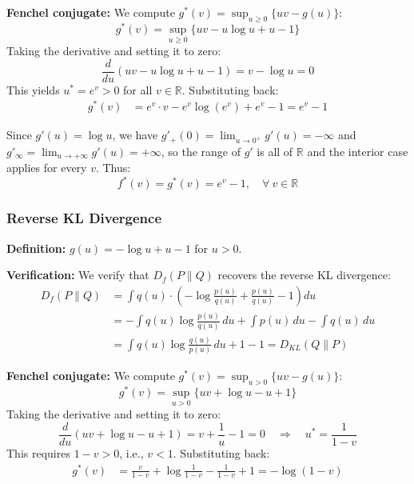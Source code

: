 \textbf{Fenchel conjugate:} We compute $g^*(v) = \sup_{u \geq 0} \{ uv - g(u) \}$:
\begin{equation*}
g^*(v) = \sup_{u \geq 0} \{ uv - u \log u + u - 1 \}
\end{equation*}
Taking the derivative and setting it to zero:
\begin{equation*}
\frac{d}{du}(uv - u \log u + u - 1) = v - \log u = 0
\end{equation*}
This yields $u^* = e^v > 0$ for all $v \in \mathbb{R}$. Substituting back:
\begin{align*}
g^*(v) &= e^v \cdot v - e^v \log(e^v) + e^v - 1  = e^v - 1
\end{align*}

Since $g'(u) = \log u$, we have $g'_+(0) = \lim_{u \to 0^+} g'(u) = -\infty$ and $g'_\infty = \lim_{u \to +\infty} g'(u) = +\infty$, so the range of $g'$ is all of $\mathbb{R}$ and the interior case applies for every $v$. Thus:
\begin{equation*}
f^*(v) = g^*(v) = e^v - 1, \quad \forall \ v \in \mathbb{R}
\end{equation*}

\subsubsection{Reverse KL Divergence}

\textbf{Definition:} $g(u) = -\log u + u - 1$ for $u > 0$.

\textbf{Verification:} We verify that $D_f(P \| Q)$ recovers the reverse KL divergence:
\begin{align*}
D_f(P \| Q) &= \int q(u) \cdot \left( -\log \frac{p(u)}{q(u)} + \frac{p(u)}{q(u)} - 1 \right) du \nonumber \\
&= -\int q(u) \log \frac{p(u)}{q(u)} \, du + \int p(u) \, du - \int q(u) \, du \nonumber \\
&= \int q(u) \log \frac{q(u)}{p(u)} \, du + 1 - 1 = D_{KL}(Q \| P)
\end{align*}

\textbf{Fenchel conjugate:} We compute $g^*(v) = \sup_{u > 0} \{ uv - g(u) \}$:
\begin{equation*}
g^*(v) = \sup_{u > 0} \{ uv + \log u - u + 1 \}
\end{equation*}
Taking the derivative and setting it to zero:
\begin{equation*}
\frac{d}{du}(uv + \log u - u + 1) = v + \frac{1}{u} - 1 = 0 \quad \Rightarrow \quad u^* = \frac{1}{1-v}
\end{equation*}
This requires $1 - v > 0$, i.e., $v < 1$. Substituting back:
\begin{align*}
g^*(v) &= \frac{v}{1-v} + \log \frac{1}{1-v} - \frac{1}{1-v} + 1 = -\log(1-v)
\end{align*}


